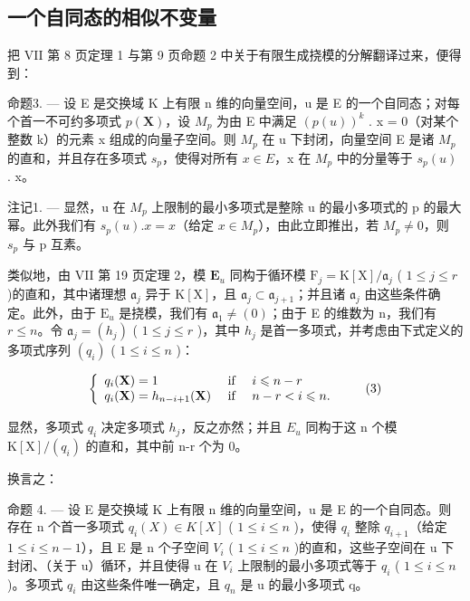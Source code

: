 \subsection{一个自同态的相似不变量}

把 VII 第 8 页定理 1 与第 9 页命题 2 中关于有限生成挠模的分解翻译过来，便得到：

命题3. --- 设 E 是交换域 K 上有限 n 维的向量空间，u 是 E 的一个自同态；对每个首一不可约多项式 \(p(\mathbf{X})\)，设 \(M_{p}\) 为由 E 中满足 \((p(u))^{k}\) . x = 0（对某个整数 k）的元素 x 组成的向量子空间。则 \(M_{p}\) 在 u 下封闭，向量空间 E 是诸 \(M_{p}\) 的直和，并且存在多项式 \(s_{p}\)，使得对所有 \(x \in E\)，x 在 \(M_{p}\) 中的分量等于 \(s_{p}(u)\) . x。

注记1. --- 显然，u 在 \(M_{p}\) 上限制的最小多项式是整除 u 的最小多项式的 p 的最大幂。此外我们有 \(s_{p}(u).x = x\)（给定 \(x \in M_{p}\)），由此立即推出，若 \(M_{p} \neq 0\)，则 \(s_{p}\) 与 p 互素。

类似地，由 VII 第 19 页定理 2，模 \(\mathbf{E}_u\) 同构于循环模 \(\mathrm{F}_j = \mathrm{K}[\mathrm{X}] / \mathfrak{a}_j\) ( \(1 \leqslant j \leqslant r\) )的直和，其中诸理想 \(\mathfrak{a}_j\) 异于 \(\mathrm{K}[\mathrm{X}]\)，且 \(\mathfrak{a}_j \subset \mathfrak{a}_{j+1}\)；并且诸 \(\mathfrak{a}_j\) 由这些条件确定。此外，由于 \(\mathrm{E}_u\) 是挠模，我们有 \(\mathfrak{a}_1 \neq (0)\)；由于 E 的维数为 n，我们有 \(r \leqslant n\)。令 \(\mathfrak{a}_j = (h_j)\) ( \(1 \leqslant j \leqslant r\) )，其中 \(h_j\) 是首一多项式，并考虑由下式定义的多项式序列 \((q_i)\) ( \(1 \leqslant i \leqslant n\) )：

\[
\left\{ \begin{array}{l l} q _ {i} (\mathbf {X}) = 1 & \text { if } \quad i \leqslant n - r \\ q _ {i} (\mathbf {X}) = h _ {n - i + 1} (\mathbf {X}) & \text { if } \quad n - r <   i \leqslant n. \end{array} \right.\tag{3}
\]

显然，多项式 \(q_{i}\) 决定多项式 \(h_{j}\)，反之亦然；并且 \(E_{u}\) 同构于这 n 个模 \(\mathrm{K}[\mathrm{X}]/(q_{i})\) 的直和，其中前 n-r 个为 0。

换言之：

命题 4. --- 设 E 是交换域 K 上有限 n 维的向量空间，u 是 E 的一个自同态。则存在 n 个首一多项式 \(q_{i}(X) \in K[X]\) ( \(1 \leqslant i \leqslant n\) )，使得 \(q_{i}\) 整除 \(q_{i+1}\)（给定 \(1 \leqslant i \leqslant n-1\)），且 E 是 n 个子空间 \(V_{i}\) ( \(1 \leqslant i \leqslant n\) )的直和，这些子空间在 u 下封闭、（关于 u）循环，并且使得 u 在 \(V_{i}\) 上限制的最小多项式等于 \(q_{i}\) ( \(1 \leqslant i \leqslant n\) )。多项式 \(q_{i}\) 由这些条件唯一确定，且 \(q_{n}\) 是 u 的最小多项式 q。

